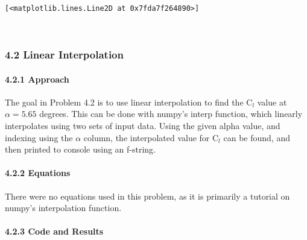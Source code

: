 \documentclass[11pt]{article}
\makeatletter
\newcommand{\boxspacing}{\kern\kvtcb@left@rule\kern\kvtcb@boxsep}
\newcommand{\prompt}[4]{
        {\ttfamily\llap{{\color{#2}[#3]:\hspace{3pt}#4}}\vspace{-\baselineskip}}
    }
\makeatother
\begin{document}
            \begin{tcolorbox}[breakable, size=fbox, boxrule=.5pt, pad at break*=1mm, opacityfill=0]
\prompt{Out}{outcolor}{8}{\boxspacing}
\begin{Verbatim}[commandchars=\\\{\}]
[<matplotlib.lines.Line2D at 0x7fda7f264890>]
\end{Verbatim}
\end{tcolorbox}
        
    \begin{center}
    \end{center}
    { \hspace*{\fill} \\}
    
    \hypertarget{linear-interpolation}{%
\subsubsection{4.2 \textbar{} Linear
Interpolation}\label{linear-interpolation}}

\hypertarget{approach}{%
\paragraph{4.2.1 \textbar{} Approach}\label{approach}}

The goal in Problem 4.2 is to use linear interpolation to find the
C\(_l\) value at \(\alpha = 5.65\) degrees. This can be done with
numpy's interp function, which linearly interpolates using two sets of
input data. Using the given alpha value, and indexing using the
\(\alpha\) column, the interpolated value for C\(_l\) can be found, and
then printed to console using an f-string.

\hypertarget{equations}{%
\paragraph{4.2.2 \textbar{} Equations}\label{equations}}

There were no equations used in this problem, as it is primarily a
tutorial on numpy's interpolation function.

\hypertarget{code-and-results}{%
\paragraph{4.2.3 \textbar{} Code and Results}\label{code-and-results}}
\end{document}
